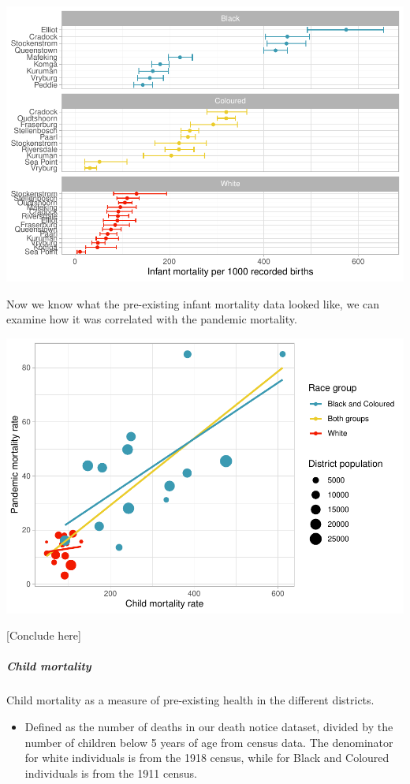 \documentclass[fleqn,10pt,lineno]{wlpeerj} %
\providecommand{\tightlist}{
\setlength{\itemsep}{0pt}\setlength{\parskip}{0pt}}
\begin{document}
\includegraphics{spanish-flu-mortality_bookdown_files/figure-latex/unnamed-chunk-10-1.pdf}

Now we know what the pre-existing infant mortality data looked like, we can examine how it was correlated with the pandemic mortality.

\includegraphics{spanish-flu-mortality_bookdown_files/figure-latex/unnamed-chunk-11-1.pdf}

{[}Conclude here{]}

\hypertarget{child-mortality}{%
\subparagraph{Child mortality}\label{child-mortality}}

Child mortality as a measure of pre-existing health in the different districts.

\begin{itemize}
\tightlist
\item
  Defined as the number of deaths in our death notice dataset, divided by the number of children below 5 years of age from census data. The denominator for white individuals is from the 1918 census, while for Black and Coloured individuals is from the 1911 census.
\end{itemize}
\end{document}
